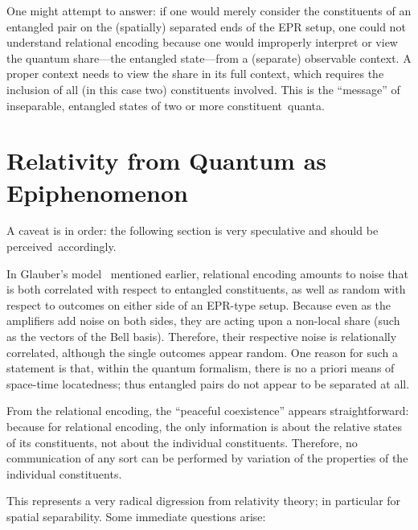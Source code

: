 \documentclass[entropy,article,accept,oneauthor,pdftex]{Definitions/mdpi}
\begin{document}
One might attempt to answer: if one would merely consider the constituents of an entangled pair on the (spatially)
separated ends of the EPR setup, one could not understand relational encoding because one would improperly
interpret or view the quantum share---the entangled state---from a (separate) observable context.
A proper context needs to view the share in its full context, which requires the inclusion of all (in this case two) constituents involved.
This is the ``message'' of inseparable, entangled states of two or more constituent~quanta.

\section{Relativity from Quantum as Epiphenomenon}

A caveat is in order: the following section is very speculative and should be perceived~accordingly.

In Glauber's model~\cite{Glauber-cat-86} mentioned earlier, relational encoding amounts to noise that is both correlated
with respect to entangled constituents, as well as random with respect to outcomes on either side of an EPR-type setup.
Because even as the amplifiers add noise on both sides, they are acting upon a non-local share (such as the vectors of the Bell basis).
Therefore, their respective noise is relationally correlated, although the single outcomes appear random.
One reason for such a statement is that, within the quantum formalism, there is no a priori means of space-time locatedness;
thus entangled pairs do not appear to be separated at all.

From the relational encoding, the ``peaceful coexistence'' appears straightforward: because for relational encoding, the only information is about the relative
states of its constituents, not about the individual constituents.
Therefore, no communication of any sort can be performed by variation of the properties of the individual constituents.

This represents a very radical digression from relativity theory; in particular for spatial separability.
Some immediate questions arise:
\end{document}
